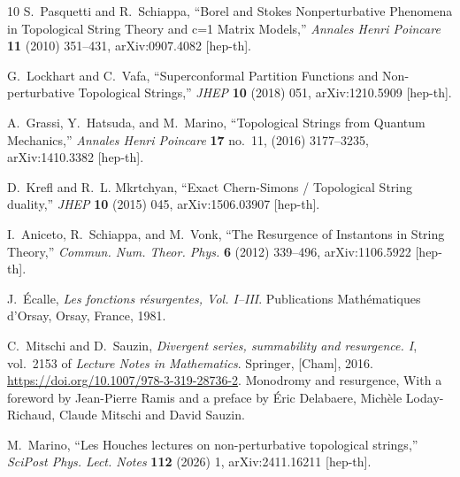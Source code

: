 \documentclass[a4paper,12pt,justification=centering]{article}
\numberwithin{equation}{section}
\providecommand{\href}[2]{#2}
\theoremstyle{plain}%
\theoremstyle{definition}
\begin{document}
\begin{thebibliography}{10}
S.~Pasquetti and R.~Schiappa, ``{Borel and Stokes Nonperturbative Phenomena in
  Topological String Theory and c=1 Matrix Models},''
  \href{http://dx.doi.org/10.1007/s00023-010-0044-5}{{\em Annales Henri
  Poincare} {\bfseries 11} (2010) 351--431},
  \href{http://arxiv.org/abs/0907.4082}{{\ttfamily arXiv:0907.4082 [hep-th]}}.

G.~Lockhart and C.~Vafa, ``{Superconformal Partition Functions and
  Non-perturbative Topological Strings},''
  \href{http://dx.doi.org/10.1007/JHEP10(2018)051}{{\em JHEP} {\bfseries 10}
  (2018) 051}, \href{http://arxiv.org/abs/1210.5909}{{\ttfamily arXiv:1210.5909
  [hep-th]}}.

A.~Grassi, Y.~Hatsuda, and M.~Marino, ``{Topological Strings from Quantum
  Mechanics},'' \href{http://dx.doi.org/10.1007/s00023-016-0479-4}{{\em Annales
  Henri Poincare} {\bfseries 17} no.~11, (2016) 3177--3235},
  \href{http://arxiv.org/abs/1410.3382}{{\ttfamily arXiv:1410.3382 [hep-th]}}.

D.~Krefl and R.~L. Mkrtchyan, ``{Exact Chern-Simons / Topological String
  duality},'' \href{http://dx.doi.org/10.1007/JHEP10(2015)045}{{\em JHEP}
  {\bfseries 10} (2015) 045}, \href{http://arxiv.org/abs/1506.03907}{{\ttfamily
  arXiv:1506.03907 [hep-th]}}.

I.~Aniceto, R.~Schiappa, and M.~Vonk, ``{The Resurgence of Instantons in String
  Theory},'' \href{http://dx.doi.org/10.4310/CNTP.2012.v6.n2.a3}{{\em Commun.
  Num. Theor. Phys.} {\bfseries 6} (2012) 339--496},
  \href{http://arxiv.org/abs/1106.5922}{{\ttfamily arXiv:1106.5922 [hep-th]}}.

J.~{\'E}calle, {\em Les fonctions r{\'e}surgentes, Vol. I--III}.
\newblock Publications Math{\'e}matiques d'Orsay, Orsay, France, 1981.

C.~Mitschi and D.~Sauzin,
  \href{http://dx.doi.org/10.1007/978-3-319-28736-2}{{\em Divergent series,
  summability and resurgence. {I}}}, vol.~2153 of {\em Lecture Notes in
  Mathematics}.
\newblock Springer, [Cham], 2016.
\newblock \url{https://doi.org/10.1007/978-3-319-28736-2}.
\newblock Monodromy and resurgence, With a foreword by Jean-Pierre Ramis and a
  preface by \'{E}ric Delabaere, Mich\`ele Loday-Richaud, Claude Mitschi and
  David Sauzin.

M.~Marino, ``{Les Houches lectures on non-perturbative topological strings},''
  \href{http://dx.doi.org/10.21468/SciPostPhysLectNotes.112}{{\em SciPost Phys.
  Lect. Notes} {\bfseries 112} (2026) 1},
  \href{http://arxiv.org/abs/2411.16211}{{\ttfamily arXiv:2411.16211
  [hep-th]}}.


\end{thebibliography}
\end{document}
